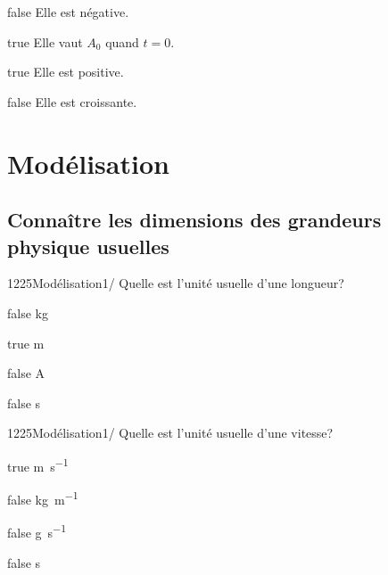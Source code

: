 \documentclass[11pt]{article}
\begin{document}
            \begin{reponses}
                \item[false] Elle est négative.
                \item[true] Elle vaut $A_0$ quand $t=0$.
                \item[true] Elle est positive.
                \item[false] Elle est croissante.
            \end{reponses}
	
    \section{Modélisation}
    
    	\subsection{Connaître les dimensions des grandeurs physique usuelles}
        	
            \begin{question}{1225}{Modélisation}{1}{/}
				Quelle est l'unité usuelle d'une longueur? 
            \end{question}

            \begin{reponses}
            	\item[false] \si{\kilo\gram}
            	\item[true] \si{\meter}
                \item[false] \si{\ampere}
                \item[false] \si{\second}
            \end{reponses}
        	
            \begin{question}{1225}{Modélisation}{1}{/}
				Quelle est l'unité usuelle d'une vitesse? 
            \end{question}

            \begin{reponses}
            	\item[true] \si{\meter\per\second}
            	\item[false] \si{\kilo\gram\per\meter}
                \item[false] \si{\gram\per\second}
                \item[false] \si{\second}
            \end{reponses}
        	
\end{document}
